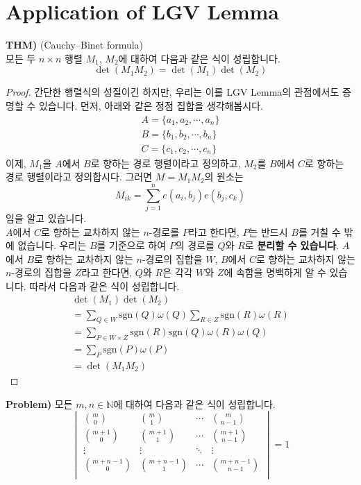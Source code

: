 \documentclass[a4paper]{article}
\begin{document}
\section{Application of LGV Lemma}
\begin{mdframed}
\textbf{THM)} (Cauchy–Binet formula)\\
모든 두 $n\times n$ 행렬 $M_1$, $M_2$에 대하여 다음과 같은 식이 성립합니다.$$\det(M_1M_2) = \det(M_1)\det(M_2)$$
\end{mdframed}
\begin{proof}
간단한 행렬식의 성질이긴 하지만, 우리는 이를 LGV Lemma의 관점에서도 증명할 수 있습니다. 먼저, 아래와 같은 정점 집합을 생각해봅시다.
\begin{eqnarray*}
A = \{a_1, a_2, \cdots, a_n\}\\
B = \{b_1, b_2, \cdots, b_n\}\\
C = \{c_1, c_2, \cdots, c_n\}
\end{eqnarray*}
이제, $M_1$을 $A$에서 $B$로 향하는 경로 행렬이라고 정의하고, $M_2$를 $B$에서 $C$로 향하는 경로 행렬이라고 정의합시다. 그러면 $M = M_1M_2$의 원소는 $$M_{ik} = \sum_{j=1}^n e(a_i,b_j)e(b_j,c_k)$$임을 알고 있습니다.\\
$A$에서 $C$로 향하는 교차하지 않는 $n$-경로를 $P$라고 한다면, $P$는 반드시 $B$를 거칠 수 밖에 없습니다. 우리는 $B$를 기준으로 하여 $P$의 경로를 $Q$와 $R$로 \textbf{분리할 수 있습니다}. $A$에서 $B$로 향하는 교차하지 않는 $n$-경로의 집합을 $W$, $B$에서 $C$로 향하는 교차하지 않는 $n$-경로의 집합을 $Z$라고 한다면, $Q$와 $R$은 각각 $W$와 $Z$에 속함을 명백하게 알 수 있습니다. 따라서 다음과 같은 식이 성립합니다.
\begin{eqnarray*}
\det(M_1)\det(M_2)\\ = \sum_{Q \in W}\mathrm{sgn}(Q)\omega(Q) \sum_{R \in Z}\mathrm{sgn}(R)\omega(R)\\
= \sum_{P \in W\times Z}\mathrm{sgn}(R)\mathrm{sgn}(Q)\omega(R)\omega(Q)\\
= \sum_{P}\mathrm{sgn}(P)\omega(P)\\
= \det(M_1M_2)
\end{eqnarray*}
\end{proof}
\begin{mdframed}
\textbf{Problem)} 모든 $m, n \in \mathbb{N}$에 대하여 다음과 같은 식이 성립합니다.
$$
\begin{vmatrix}
\binom{m}{0} & \binom{m}{1} & \cdots & \binom{m}{n-1} \\
\binom{m+1}{0} & \binom{m+1}{1} & \cdots & \binom{m+1}{n-1} \\
\vdots & \vdots & \ddots & \vdots \\
\binom{m+n-1}{0} & \binom{m+n-1}{1} & \cdots & \binom{m+n-1}{n-1} \\
\end{vmatrix} = 1
$$
\end{mdframed}
\end{document}
